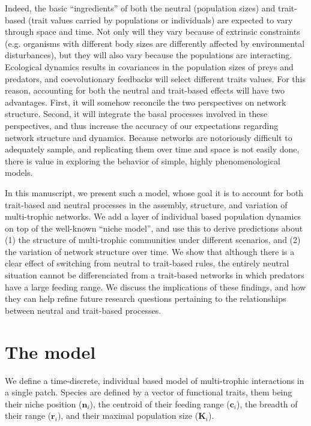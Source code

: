 \documentclass[10pt,twocolumn,fleqn]{article}
\begin{document}
Indeed, the basic ``ingredients'' of both the neutral (population sizes) and
trait-based (trait values carried by populations or individuals) are expected to
vary through space and time. Not only will they vary because of extrinsic
constraints (e.g. organisms with different body sizes are differently affected
by environmental disturbances), but they will also vary because the populations
are interacting. Ecological dynamics results in covariances in the population
sizes of preys and predators, and coevolutionary feedbacks will select different
traits values. For this reason, accounting for both the neutral and trait-based
effects will have two advantages. First, it will somehow reconcile the two
perspectives on network structure. Second, it will integrate the basal processes
involved in these perspectives, and thus increase the accuracy of our
expectations regarding network structure and dynamics. Because networks are
notoriously difficult to adequately sample, and replicating them over time and
space is not easily done, there is value in exploring the behavior of simple,
highly phenomenological models.

In this manuscript, we present such a model, whose goal it is to account for
both trait-based and neutral processes in the assembly, structure, and variation
of multi-trophic networks. We add a layer of individual based population
dynamics on top of the well-known ``niche model'', and use this to derive
predictions about (1) the structure of multi-trophic communities under different
scenarios, and (2) the variation of network structure over time. We show that
although there is a clear effect of switching from neutral to trait-based rules,
the entirely neutral situation cannot be differenciated from a trait-based
networks in which predators have a large feeding range. We discuss the
implications of these findings, and how they can help refine future research
questions pertaining to the relationships between neutral and trait-based
processes.

\section{The model}

We define a time-discrete, individual based model of multi-trophic interactions in a single
patch. Species are defined by a vector of functional traits, them being their
niche position ($\mathbf{n}_i$), the centroid of their feeding range
($\mathbf{c}_i$), the breadth of their range ($\mathbf{r}_i$), and their
maximal population size ($\mathbf{K}_i$).
\end{document}
